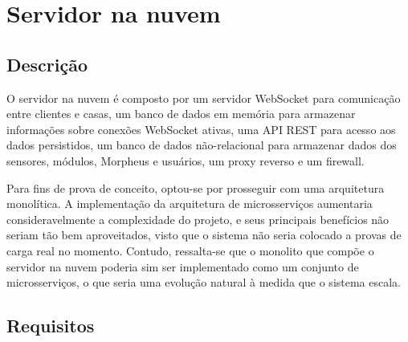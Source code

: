 \section{Servidor na nuvem}

\subsection{Descrição}

O servidor na nuvem é composto por um servidor WebSocket para comunicação entre clientes e casas, um banco de dados em memória para armazenar informações sobre conexões WebSocket ativas, uma API REST para acesso aos dados persistidos, um banco de dados não-relacional para armazenar dados dos sensores, módulos, Morpheus e usuários, um proxy reverso e um firewall.

Para fins de prova de conceito, optou-se por prosseguir com uma arquitetura monolítica. A implementação da arquitetura de microsserviços aumentaria consideravelmente a complexidade do projeto, e seus principais benefícios não seriam tão bem aproveitados, visto que o sistema não seria colocado a provas de carga real no momento. Contudo, ressalta-se que o monolito que compõe o servidor na nuvem poderia sim ser implementado como um conjunto de microsserviços, o que seria uma evolução natural à medida que o sistema escala.

\subsection{Requisitos}

